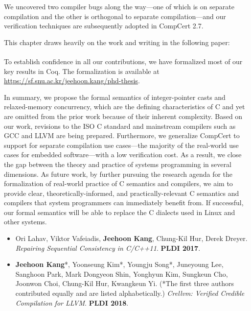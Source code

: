 We uncovered two compiler bugs along the way---one of which is on separate compilation and the other
is orthogonal to separate compilation---and our verification techniques are subsequently adopted in
CompCert 2.7.

This chapter draws heavily on the work and writing in the following paper:


\paragraph*{}

To establish confidence in all our contributions, we have formalized most of our key results in Coq.
The formalization is available at \url{https://sf.snu.ac.kr/jeehoon.kang/phd-thesis}.

In summary, we propose the formal semantics of integer-pointer casts and relaxed-memory concurrency,
which are the defining characteristics of C and yet are omitted from the prior work because of their
inherent complexity.  Based on our work, revisions to the ISO C standard and mainstream compilers
such as GCC and LLVM are being prepared.  Furthermore, we generalize CompCert to support for
separate compilation use cases---the majority of the real-world use cases for embedded
software---with a low verification cost.  As a result, we close the gap between the theory and
practice of systems programming in several dimensions.  As future work, by further pursuing the
research agenda for the formalization of real-world practice of C semantics and compilers, we aim to
provide clear, theoretically-informed, and practically-relevant C semantics and compilers that
system programmers can immediately benefit from.  If successful, our formal semantics will be able
to replace the C dialects used in Linux and other systems.




\begin{itemize}
\item[\cite{scfix}] Ori Lahav, Viktor Vafeiadis, \textbf{Jeehoon Kang}, Chung-Kil Hur, Derek Dreyer.
  \emph{Repairing Sequential Consistency in C/C++11}.  \textbf{PLDI 2017}.
\item[\cite{crellvm}] \textbf{Jeehoon Kang}*, Yoonseung Kim*, Youngju Song*, Juneyoung Lee, Sanghoon
  Park, Mark Dongyeon Shin, Yonghyun Kim, Sungkeun Cho, Joonwon Choi, Chung-Kil Hur, Kwangkeun Yi.
  (*The first three authors contributed equally and are listed alphabetically.)  \emph{Crellvm:
    Verified Credible Compilation for LLVM}.  \textbf{PLDI 2018}.
\end{itemize}


